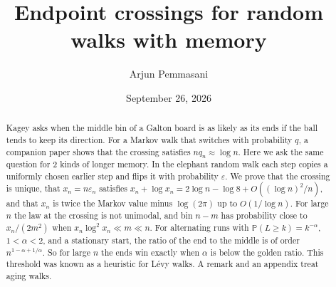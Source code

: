 \documentclass[11pt]{article}
\title{Endpoint crossings for random walks with memory}
\author{Arjun Pemmasani}
\date{September 26, 2026}
\theoremstyle{definition}
\theoremstyle{remark}
\newcommand{\Prob}{\mathbb{P}}
\begin{document}
\maketitle

\begin{abstract}
Kagey asks when the middle bin of a Galton board is as likely as its ends
if the ball tends to keep its direction. For a Markov walk that switches
with probability $q$, a companion paper shows that the crossing satisfies
$nq_n\approx\log n$. Here we ask the same question for 2 kinds of longer
memory. In the elephant random walk each step copies a uniformly chosen
earlier step and flips it with probability $\varepsilon$. We prove that the
crossing is unique, that $x_n=n\varepsilon_n$ satisfies
$x_n+\log x_n=2\log n-\log8+O((\log n)^2/n)$, and that $x_n$ is twice the
Markov value minus $\log(2\pi)$ up to $O(1/\log n)$. For large $n$ the law
at the crossing is not unimodal, and bin $n-m$ has probability close to
$x_n/(2m^2)$ when $x_n\log^2x_n\ll m\ll n$. For alternating runs with
$\Prob(L\ge k)=k^{-\alpha}$, $1<\alpha<2$, and a stationary start, the ratio
of the end to the middle is of order $n^{1-\alpha+1/\alpha}$. So for large
$n$ the ends win exactly when $\alpha$ is below the golden ratio. This
threshold was known as a heuristic for L\'evy walks. A remark and an
appendix treat aging walks.
\end{abstract}







\appendix




\end{document}
